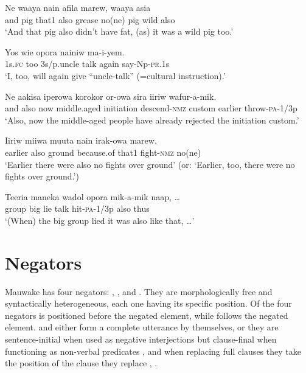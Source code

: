 \ea%
\label{ex:3:x749}
\gll Ne waaya nain  afila marew, waaya asia  \\
and pig that1 also grease no(ne) pig wild also\\
\glt`And that pig also didn't have fat, (as) it was a wild pig too.'
\z

\ea%
\label{ex:3:x1937}
\gll Yos  wie opora nainiw ma-i-yem. \\
1s.\textsc{fc} too 3s/p.uncle talk again say-Np-\textsc{pr}.1s\\
\glt`I, too, will again give ``uncle-talk'' (=cultural instruction).'
\z

\ea%
\label{ex:3:x750}
\gll Ne  aakisa iperowa korokor or-owa sira iiriw wafur-a-mik.\\
and also now middle.aged initiation descend-\textsc{nmz} custom earlier throw-\textsc{pa}-1/3p\\
\glt`Also, now the middle-aged people have already rejected the initiation custom.'
\z

\ea%
\label{ex:3:x751}
\gll Iiriw  miiwa muuta nain irak-owa marew. \\
earlier also ground because.of that1 fight-\textsc{nmz} no(ne)\\
\glt`Earlier there were also no fights over ground' (or: `Earlier, too, there were no fights over ground.')
\z

\ea%
\label{ex:3:x808}
\gll Teeria maneka wadol opora mik-a-mik  naap, {\dots} \\
group big lie talk hit-\textsc{pa}-1/3p also thus\\
\glt`(When) the big group lied it was also like that, {\dots}'
\z

\section{Negators} \label{sec:3.10}
{}
Mauwake has four negators: , ,  and . They are morphologically free and syntactically heterogeneous, each one having its specific position. Of the four negators  is positioned before the negated element, while  follows the negated element.  and  either form a complete utterance by themselves, or they are sentence-initial when used as negative interjections  but clause-final when functioning as non-verbal predicates , and when replacing full clauses they take the position of the clause they replace , . 


